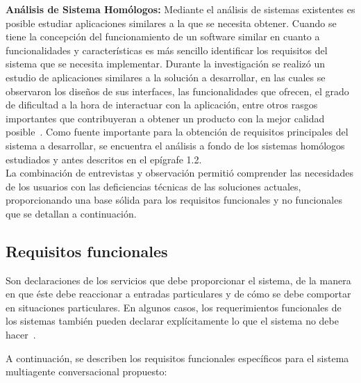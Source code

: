 \textbf{Análisis de Sistema Homólogos:} Mediante el análisis de sistemas existentes es
posible estudiar aplicaciones similares a la que se necesita obtener. Cuando se tiene
la concepción del funcionamiento de un software similar en cuanto a funcionalidades
y características es más sencillo identificar los requisitos del sistema que se necesita
implementar. Durante la investigación se realizó un estudio de aplicaciones similares
a la solución a desarrollar, en las cuales se observaron los diseños de sus interfaces,
las funcionalidades que ofrecen, el grado de dificultad a la hora de interactuar con
la aplicación, entre otros rasgos importantes que contribuyeran a obtener un
producto con la mejor calidad posible~\cite{sommerville2011software}. Como fuente importante
para la obtención de requisitos principales del sistema a desarrollar, se encuentra el
análisis a fondo de los sistemas homólogos estudiados y antes descritos en el
epígrafe 1.2.\\
La combinación de entrevistas y observación permitió comprender las necesidades de los usuarios con las deficiencias técnicas de las soluciones actuales, proporcionando una base sólida para los requisitos funcionales y no funcionales que se detallan a continuación.



\subsection{Requisitos funcionales}

Son declaraciones de los servicios que debe proporcionar el sistema, de la manera en que
éste debe reaccionar a entradas particulares y de cómo se debe comportar en situaciones
particulares. En algunos casos, los requerimientos funcionales de los sistemas también
pueden declarar explícitamente lo que el sistema no debe hacer~\cite{sommerville2011software}.

A continuación, se describen los requisitos funcionales específicos para el sistema multiagente conversacional propuesto:

